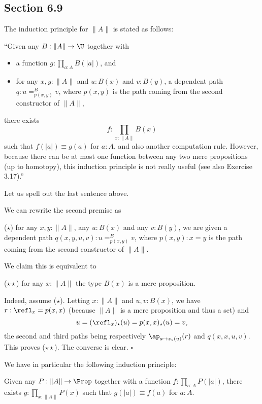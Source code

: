 \documentclass[12pt]{article}
\begin{document}

\subsection{Section 6.9}\label{69}

The induction principle for $\lVert A\rVert$ is stated as follows:

\nn``Given any $B:\lVert A\rVert\to\U$ together with
\begin{itemize}
\item a function $g:\prod_{a:A}B(\lvert a\rvert)$, and
\item for any $x,y:\lVert A\rVert$ and $u:B(x)$ and $v:B(y)$, a dependent path $q:u=^B_{p(x,y)}v$, where $p(x,y)$ is the path coming from the second constructor of $\lVert A\rVert$,
\end{itemize}
there exists 
$$
f:\prod_{x:\lVert A\rVert}B(x)
$$ 
such that $f(\lvert a\rvert)\equiv g(a)$ for $a:A$, and also another computation rule. However, because there can be at most one function between any two mere propositions (up to homotopy), this induction principle is not really useful (see also Exercise 3.17).''

Let us spell out the last sentence above.

We can rewrite the second premise as

\nn($\star$) for any $x,y:\lVert A\rVert$, any $u:B(x)$ and any $v:B(y)$, we are given a dependent path $q(x,y,u,v):u=^B_{p(x,y)}v$, where $p(x,y):x=y$ is the path coming from the second constructor of $\lVert A\rVert$.

We claim this is equivalent to

\nn($\star\star$) for any $x:\lVert A\rVert$ the type $B(x)$ is a mere proposition.

Indeed, assume ($\star$). Letting $x:\lVert A\rVert$ and $u,v:B(x)$, we have $r:\refl_x=p(x,x)$ (because $\lVert A\rVert$ is a mere proposition and thus a set) and 
$$
u=(\refl_x)_\star(u)=p(x,x)_\star(u)=v,
$$ 
the second and third paths being respectively $\ap_{s\mapsto s_\star(u)}(r)$ and $q(x,x,u,v)$. This proves ($\star\star$). The converse is clear. $\square$

We have in particular the following induction principle:

Given any $P:\lVert A\rVert\to\Prop$ together with a function $f:\prod_{a:A}P(\lvert a\rvert)$, there exists $g:\prod_{x:\lVert A\rVert}P(x)$ such that $g(\lvert a\rvert)\equiv f(a)$ for $a:A$.

\end{document}
